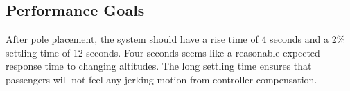 \subsection{Performance Goals}

After pole placement, the system should have a rise time of 4 seconds and a 2\% settling time
of 12 seconds. Four seconds seems like a reasonable expected response
time to changing altitudes. The long settling time ensures that passengers
will not feel any jerking motion from controller compensation.
